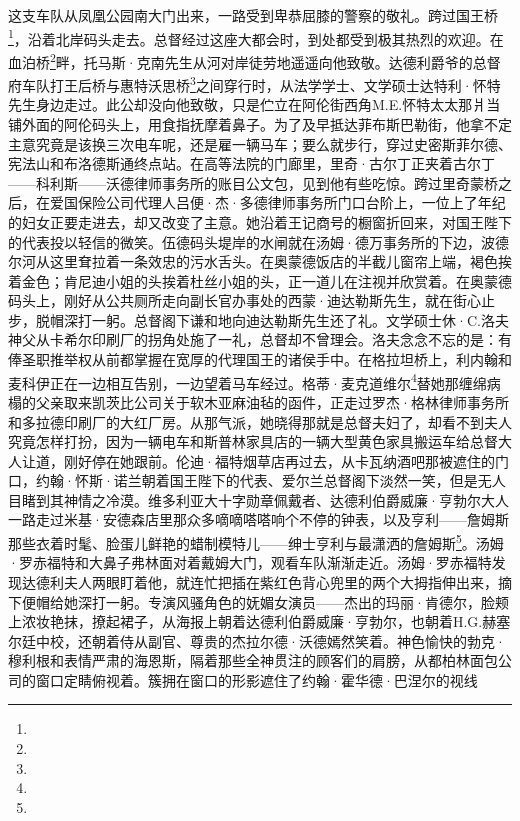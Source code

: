 \par 这支车队从凤凰公园南大门出来，一路受到卑恭屈膝的警察的敬礼。跨过国王桥\footnote{}，沿着北岸码头走去。总督经过这座大都会时，到处都受到极其热烈的欢迎。在血泊桥\footnote{}畔，托马斯·克南先生从河对岸徒劳地遥遥向他致敬。达德利爵爷的总督府车队打王后桥与惠特沃思桥\footnote{}之间穿行时，从法学学士、文学硕士达特利·怀特先生身边走过。此公却没向他致敬，只是伫立在阿伦街西角M.E.怀特太太那爿当铺外面的阿伦码头上，用食指抚摩着鼻子。为了及早抵达菲布斯巴勒街，他拿不定主意究竟是该换三次电车呢，还是雇一辆马车；要么就步行，穿过史密斯菲尔德、宪法山和布洛德斯通终点站。在高等法院的门廊里，里奇·古尔丁正夹着古尔丁——科利斯——沃德律师事务所的账目公文包，见到他有些吃惊。跨过里奇蒙桥之后，在爱国保险公司代理人吕便·杰·多德律师事务所门口台阶上，一位上了年纪的妇女正要走进去，却又改变了主意。她沿着王记商号的橱窗折回来，对国王陛下的代表投以轻信的微笑。伍德码头堤岸的水闸就在汤姆·德万事务所的下边，波德尔河从这里耷拉着一条效忠的污水舌头。在奥蒙德饭店的半截儿窗帘上端，褐色挨着金色；肯尼迪小姐的头挨着杜丝小姐的头，正一道儿在注视并欣赏着。在奥蒙德码头上，刚好从公共厕所走向副长官办事处的西蒙·迪达勒斯先生，就在街心止步，脱帽深打一躬。总督阁下谦和地向迪达勒斯先生还了礼。文学硕士休·C.洛夫神父从卡希尔印刷厂的拐角处施了一礼，总督却不曾理会。洛夫念念不忘的是：有俸圣职推举权从前都掌握在宽厚的代理国王的诸侯手中。在格拉坦桥上，利内翰和麦科伊正在一边相互告别，一边望着马车经过。格蒂·麦克道维尔\footnote{}替她那缠绵病榻的父亲取来凯茨比公司关于软木亚麻油毡的函件，正走过罗杰·格林律师事务所和多拉德印刷厂的大红厂房。从那气派，她晓得那就是总督夫妇了，却看不到夫人究竟怎样打扮，因为一辆电车和斯普林家具店的一辆大型黄色家具搬运车给总督大人让道，刚好停在她跟前。伦迪·福特烟草店再过去，从卡瓦纳酒吧那被遮住的门口，约翰·怀斯·诺兰朝着国王陛下的代表、爱尔兰总督阁下淡然一笑，但是无人目睹到其神情之冷漠。维多利亚大十字勋章佩戴者、达德利伯爵威廉·亨勃尔大人一路走过米基·安德森店里那众多嘀嘀嗒嗒响个不停的钟表，以及亨利——詹姆斯那些衣着时髦、脸蛋儿鲜艳的蜡制模特儿——绅士亨利与最潇洒的詹姆斯\footnote{}。汤姆·罗赤福特和大鼻子弗林面对着戴姆大门，观看车队渐渐走近。汤姆·罗赤福特发现达德利夫人两眼盯着他，就连忙把插在紫红色背心兜里的两个大拇指伸出来，摘下便帽给她深打一躬。专演风骚角色的妩媚女演员——杰出的玛丽·肯德尔，脸颊上浓妆艳抹，撩起裙子，从海报上朝着达德利伯爵威廉·亨勃尔，也朝着H.G.赫塞尔廷中校，还朝着侍从副官、尊贵的杰拉尔德·沃德嫣然笑着。神色愉快的勃克·穆利根和表情严肃的海恩斯，隔着那些全神贯注的顾客们的肩膀，从都柏林面包公司的窗口定睛俯视着。簇拥在窗口的形影遮住了约翰·霍华德·巴涅尔的视线